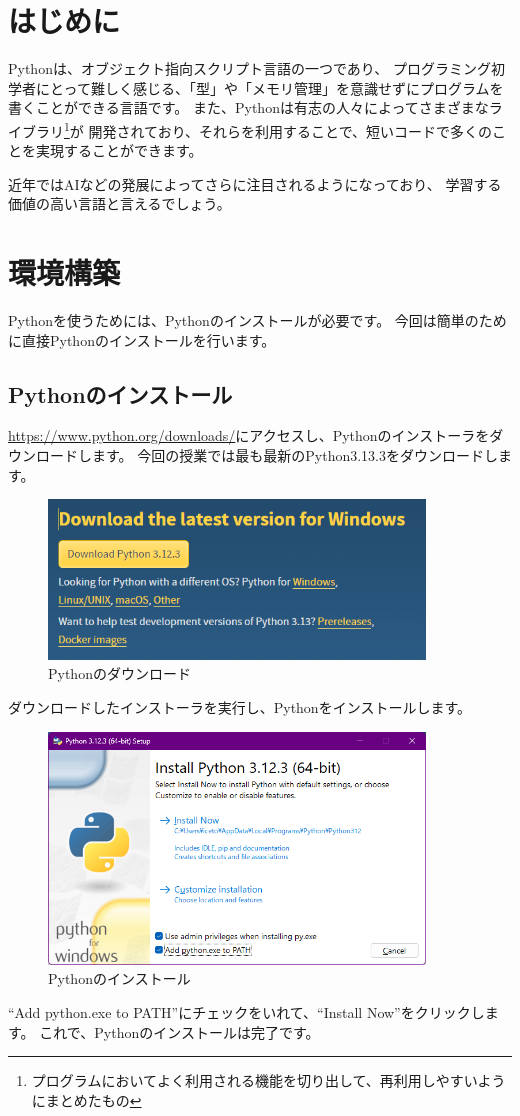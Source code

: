 \documentclass[a4paper,titlepage,dvipdfmx]{jarticle}
\begin{document}
\section{はじめに}
Pythonは、オブジェクト指向スクリプト言語の一つであり、
プログラミング初学者にとって難しく感じる、「型」や「メモリ管理」を意識せずにプログラムを書くことができる言語です。
また、Pythonは有志の人々によってさまざまなライブラリ\footnote{プログラムにおいてよく利用される機能を切り出して、再利用しやすいようにまとめたもの}が
開発されており、それらを利用することで、短いコードで多くのことを実現することができます。

近年ではAIなどの発展によってさらに注目されるようになっており、
学習する価値の高い言語と言えるでしょう。
\section{環境構築}
Pythonを使うためには、Pythonのインストールが必要です。
今回は簡単のために直接Pythonのインストールを行います。
\subsection{Pythonのインストール}
\url{https://www.python.org/downloads/}にアクセスし、Pythonのインストーラをダウンロードします。
今回の授業では最も最新のPython3.13.3をダウンロードします。
\begin{figure}[H]
  \centering
  \includegraphics[width=10cm]{./figs/python-download.png}
  \caption{Pythonのダウンロード}
\end{figure}

ダウンロードしたインストーラを実行し、Pythonをインストールします。
\begin{figure}[H]
  \centering
  \includegraphics[width=10cm]{./figs/python-install.png}
  \caption{Pythonのインストール}
\end{figure}
``Add python.exe to PATH''にチェックをいれて、``Install Now''をクリックします。
これで、Pythonのインストールは完了です。
\end{document}
